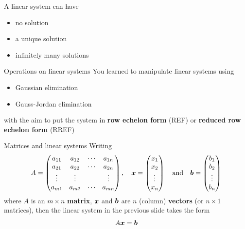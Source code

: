 \documentclass[aspectratio=169]{beamer}\usepackage[]{graphicx}\usepackage[]{xcolor}
\begin{document}
\begin{frame}
\begin{importanttheorem}
\label{th:nature_solutions_linear_system}
A linear system can have
\begin{itemize}
	\item no solution
	\item a unique solution
	\item infinitely many solutions
\end{itemize}
\end{importanttheorem}
\end{frame}


\begin{frame}{Operations on linear systems}
You learned to manipulate linear systems using
\begin{itemize}
	\item Gaussian elimination
	\item Gauss-Jordan elimination
\end{itemize}
with the aim to put the system in \textbf{row echelon form} (REF) or \textbf{reduced row echelon form} (RREF) 
\end{frame}


\begin{frame}{Matrices and linear systems}
Writing
\[
A=
\begin{pmatrix}
a_{11} & a_{12} & \cdots & a_{1n} \\
a_{21} & a_{22} & \cdots & a_{2n} \\
\vdots &\vdots & & \vdots \\
a_{m1} & a_{m2} & \cdots & a_{mn}
\end{pmatrix},\quad
\bm{x}=
\begin{pmatrix}
x_1\\ x_2 \\ \vdots \\ x_n
\end{pmatrix}
\quad\textrm{and}\quad
\bm{b}=
\begin{pmatrix}
b_1\\ b_2 \\ \vdots \\ b_n
\end{pmatrix}
\]
where $A$ is an $m\times n$ \textbf{matrix}, $\bm{x}$ and $\bm{b}$ are $n$ (column) \textbf{vectors} (or $n\times 1$ matrices), then the linear system in the previous slide takes the form
\[
A\bm{x}=\bm{b}
\]
\end{frame}
\end{document}

